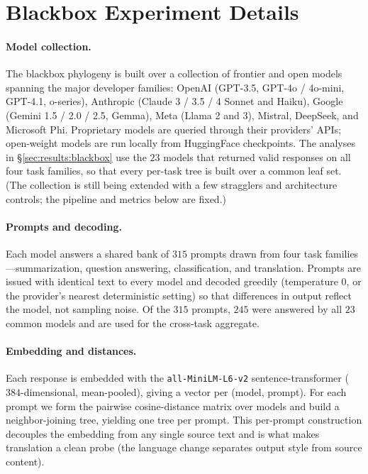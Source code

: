 \documentclass{article}
\theoremstyle{definition}
\theoremstyle{plain}
\begin{document}
\section{Blackbox Experiment Details}
\label{app:blackbox}

\paragraph{Model collection.} The blackbox phylogeny is built over a collection of frontier and open
models spanning the major developer families: OpenAI (GPT-3.5, GPT-4o / 4o-mini, GPT-4.1, o-series),
Anthropic (Claude 3 / 3.5 / 4 Sonnet and Haiku), Google (Gemini 1.5 / 2.0 / 2.5, Gemma), Meta (Llama 2
and 3), Mistral, DeepSeek, and Microsoft Phi. Proprietary models are queried through their providers'
APIs; open-weight models are run locally from HuggingFace checkpoints. The analyses in
\S\ref{sec:results:blackbox} use the $23$ models that returned valid responses on all four task
families, so that every per-task tree is built over a common leaf set. (The collection is still being
extended with a few stragglers and architecture controls; the pipeline and metrics below are fixed.)

\paragraph{Prompts and decoding.} Each model answers a shared bank of $315$ prompts drawn from four task
families---summarization, question answering, classification, and translation. Prompts are issued with
identical text to every model and decoded greedily (temperature $0$, or the provider's nearest
deterministic setting) so that differences in output reflect the model, not sampling noise. Of the
$315$ prompts, $245$ were answered by all $23$ common models and are used for the cross-task aggregate.

\paragraph{Embedding and distances.} Each response is embedded with the
\texttt{all-MiniLM-L6-v2} sentence-transformer ($384$-dimensional, mean-pooled), giving a vector per
(model, prompt). For each prompt we form the pairwise cosine-distance matrix over models and build a
neighbor-joining tree, yielding one tree per prompt. This per-prompt construction decouples the
embedding from any single source text and is what makes translation a clean probe (the language change
separates output style from source content).
\end{document}

